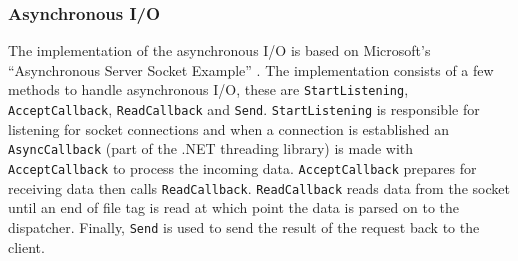 \subsubsection{Asynchronous I/O}
\label{sec:asyncImplementation}
The implementation of the asynchronous I/O is based on Microsoft's ``Asynchronous Server Socket Example'' \cite{asynh-imlp}. The implementation consists of a few methods to handle asynchronous I/O, these are \texttt{StartListening}, \texttt{AcceptCallback}, \texttt{ReadCallback} and \texttt{Send}. \texttt{StartListening} is responsible for listening for socket connections and when a connection is established an \texttt{AsyncCallback} (part of the .NET threading library) is made with \texttt{AcceptCallback} to process the incoming data. \texttt{AcceptCallback} prepares for receiving data then calls \texttt{ReadCallback}. \texttt{ReadCallback} reads data from the socket until an end of file tag is read at which point the data is parsed on to the dispatcher. Finally, \texttt{Send} is used to send the result of the request back to the client. %